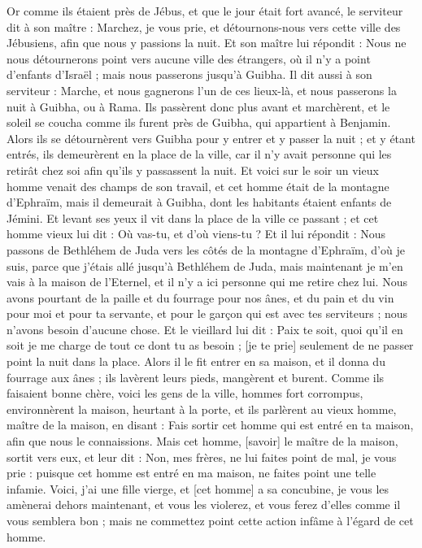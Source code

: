 \begin{multicols}{2}
Or comme ils étaient près de Jébus, et que le jour était fort avancé, le serviteur dit à son maître : Marchez, je vous prie, et détournons-nous vers cette ville des Jébusiens, afin que nous y passions la nuit.
Et son maître lui répondit : Nous ne nous détournerons point vers aucune ville des étrangers, où il n'y a point d'enfants d'Israël ; mais nous passerons jusqu'à Guibha.
Il dit aussi à son serviteur : Marche, et nous gagnerons l'un de ces lieux-là, et nous passerons la nuit à Guibha, ou à Rama.
Ils passèrent donc plus avant et marchèrent, et le soleil se coucha comme ils furent près de Guibha, qui appartient à Benjamin.
Alors ils se détournèrent vers Guibha pour y entrer et y passer la nuit ; et y étant entrés, ils demeurèrent en la place de la ville, car il n'y avait personne qui les retirât chez soi afin qu'ils y passassent la nuit.
Et voici sur le soir un vieux homme venait des champs de son travail, et cet homme était de la montagne d'Ephraïm, mais il demeurait à Guibha, dont les habitants étaient enfants de Jémini.
Et levant ses yeux il vit dans la place de la ville ce passant ; et cet homme vieux lui dit : Où vas-tu, et d'où viens-tu ?
Et il lui répondit : Nous passons de Bethléhem de Juda vers les côtés de la montagne d'Ephraïm, d'où je suis, parce que j'étais allé jusqu'à Bethléhem de Juda, mais maintenant je m'en vais à la maison de l'Eternel, et il n'y a ici personne qui me retire chez lui.
Nous avons pourtant de la paille et du fourrage pour nos ânes, et du pain et du vin pour moi et pour ta servante, et pour le garçon qui est avec tes serviteurs ; nous n'avons besoin d'aucune chose.
Et le vieillard lui dit : Paix te soit, quoi qu'il en soit je me charge de tout ce dont tu as besoin ; [je te prie] seulement de ne passer point la nuit dans la place.
Alors il le fit entrer en sa maison, et il donna du fourrage aux ânes ; ils lavèrent leurs pieds, mangèrent et burent.
Comme ils faisaient bonne chère, voici les gens de la ville, hommes fort corrompus, environnèrent la maison, heurtant à la porte, et ils parlèrent au vieux homme, maître de la maison, en disant : Fais sortir cet homme qui est entré en ta maison, afin que nous le connaissions.
Mais cet homme, [savoir] le maître de la maison, sortit vers eux, et leur dit : Non, mes frères, ne lui faites point de mal, je vous prie : puisque cet homme est entré en ma maison, ne faites point une telle infamie.
Voici, j'ai une fille vierge, et [cet homme] a sa concubine, je vous les amènerai dehors maintenant, et vous les violerez, et vous ferez d'elles comme il vous semblera bon ; mais ne commettez point cette action infâme à l'égard de cet homme.

\end{multicols}
